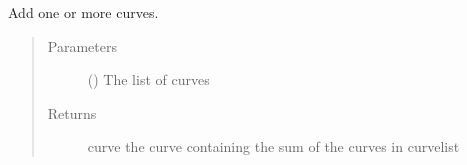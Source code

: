 \documentclass[letterpaper,10pt,english]{sphinxmanual}
\begin{document}
\begin{fulllineitems}
\label{\detokenize{pydv:pydvpy.add}}
Add one or more curves.

\begin{sphinxVerbatim}[commandchars=\\\{\}]
  
\end{sphinxVerbatim}

\begin{sphinxVerbatim}[commandchars=\\\{\}]
  
\end{sphinxVerbatim}
\begin{quote}\begin{description}
\item[{Parameters}] \leavevmode
{} () \textendash{} The list of curves

\item[{Returns}] \leavevmode
curve \textendash{} the curve containing the sum of the curves in curvelist

\end{description}\end{quote}

\end{fulllineitems}


\begin{fulllineitems}
\label{\detokenize{pydv:pydvpy.alpha}}
\end{fulllineitems}

\end{document}
